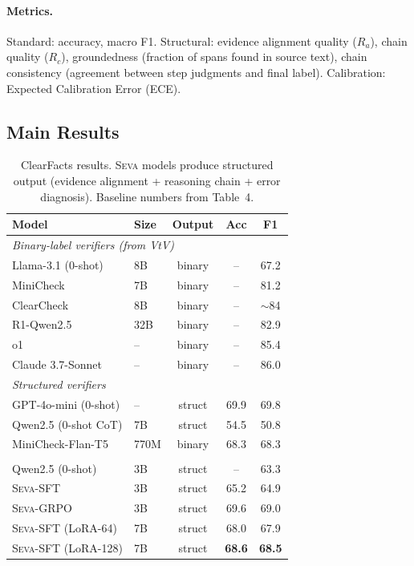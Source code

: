 \documentclass[11pt]{article}
\newcommand{\seva}{\textsc{Seva}\xspace}
\newcommand{\realnumber}[1]{\textbf{#1}}
\begin{document}
\paragraph{Metrics.}
Standard: accuracy, macro F1.
Structural: evidence alignment quality ($R_a$), chain quality ($R_c$), groundedness (fraction of spans found in source text), chain consistency (agreement between step judgments and final label).
Calibration: Expected Calibration Error (ECE).


\subsection{Main Results}

\begin{table}[t]
\centering
\small
\caption{ClearFacts results. \seva models produce structured output (evidence alignment + reasoning chain + error diagnosis). Baseline numbers from \citet{seo2025vtv} Table~4.}
\label{tab:main}
\setlength{\tabcolsep}{3.5pt}
\begin{tabular}{llccc}
\toprule
\textbf{Model} & \textbf{Size} & \textbf{Output} & \textbf{Acc} & \textbf{F1} \\
\midrule
\multicolumn{5}{l}{\textit{Binary-label verifiers (from VtV)}} \\
Llama-3.1 (0-shot) & 8B & binary & -- & 67.2 \\
MiniCheck & 7B & binary & -- & 81.2 \\
ClearCheck & 8B & binary & -- & $\sim$84 \\
R1-Qwen2.5 & 32B & binary & -- & 82.9 \\
o1 & -- & binary & -- & 85.4 \\
Claude 3.7-Sonnet & -- & binary & -- & 86.0 \\
\midrule
\multicolumn{5}{l}{\textit{Structured verifiers}} \\
GPT-4o-mini (0-shot) & -- & struct & 69.9 & 69.8 \\
Qwen2.5 (0-shot CoT) & 7B & struct & 54.5 & 50.8 \\
MiniCheck-Flan-T5 & 770M & binary & 68.3 & 68.3 \\
\hdashline
\multicolumn{5}{l}{\textit{Ours}} \\
Qwen2.5 (0-shot) & 3B & struct & -- & 63.3 \\
\seva-SFT & 3B & struct & 65.2 & 64.9 \\
\seva-GRPO & 3B & struct & 69.6 & 69.0 \\
\hdashline
\seva-SFT (LoRA-64) & 7B & struct & 68.0 & 67.9 \\
\seva-SFT (LoRA-128) & 7B & struct & \realnumber{68.6} & \realnumber{68.5} \\
\bottomrule
\end{tabular}
\end{table}
\end{document}
